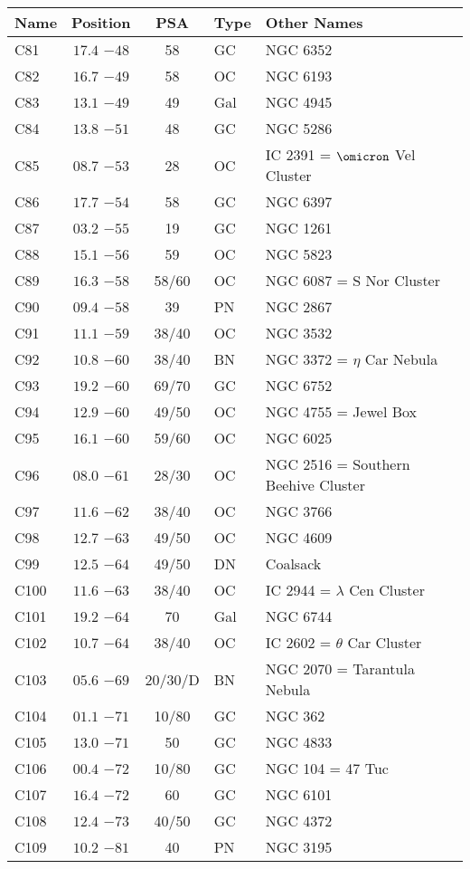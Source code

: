 \begin{table}[p]
\setlength{\tabcolsep}{3pt}
\small
\begin{tabular}{lcclll}
\hline
Name&Position&PSA&Type&Other Names\\
\hline
C81  &$17.4$ $-48$&58&GC &NGC 6352\\
C82  &$16.7$ $-49$&58&OC &NGC 6193\\
C83  &$13.1$ $-49$&49&Gal&NGC 4945\\
C84  &$13.8$ $-51$&48&GC &NGC 5286\\
C85  &$08.7$ $-53$&28&OC &IC 2391 = $\omicron$ Vel Cluster\\
C86  &$17.7$ $-54$&58&GC &NGC 6397\\
C87  &$03.2$ $-55$&19&GC &NGC 1261\\
C88  &$15.1$ $-56$&59&OC &NGC 5823\\
C89  &$16.3$ $-58$&58/60&OC &NGC 6087 = S Nor Cluster\\
C90  &$09.4$ $-58$&39&PN &NGC 2867\\
C91  &$11.1$ $-59$&38/40&OC &NGC 3532\\
C92  &$10.8$ $-60$&38/40&BN &NGC 3372 = $\eta$ Car Nebula\\
C93  &$19.2$ $-60$&69/70&GC &NGC 6752\\
C94  &$12.9$ $-60$&49/50&OC &NGC 4755 = Jewel Box\\
C95  &$16.1$ $-60$&59/60&OC &NGC 6025\\
C96  &$08.0$ $-61$&28/30&OC &NGC 2516 = Southern Beehive Cluster\\
C97  &$11.6$ $-62$&38/40&OC &NGC 3766\\
C98  &$12.7$ $-63$&49/50&OC &NGC 4609\\
C99  &$12.5$ $-64$&49/50&DN &Coalsack\\
C100 &$11.6$ $-63$&38/40&OC &IC 2944 = $\lambda$ Cen Cluster\\
C101 &$19.2$ $-64$&70&Gal&NGC 6744\\
C102 &$10.7$ $-64$&38/40&OC &IC 2602 = $\theta$ Car Cluster\\
C103 &$05.6$ $-69$&20/30/D&BN &NGC 2070 = Tarantula Nebula\\
C104 &$01.1$ $-71$&10/80&GC &NGC 362\\
C105 &$13.0$ $-71$&50&GC &NGC 4833\\
C106 &$00.4$ $-72$&10/80&GC &NGC 104 = 47 Tuc\\
C107 &$16.4$ $-72$&60&GC &NGC 6101\\
C108 &$12.4$ $-73$&40/50&GC &NGC 4372\\
C109 &$10.2$ $-81$&40&PN &NGC 3195\\
\hline
\end{tabular}
\end{table}

